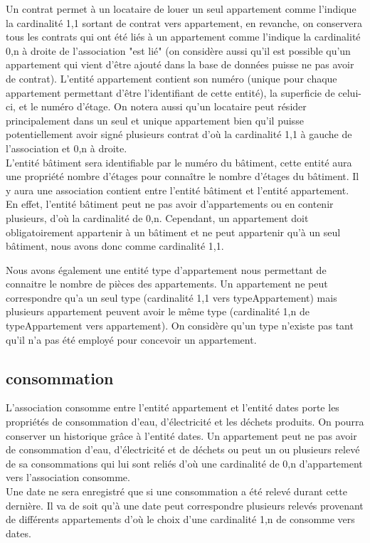 Un contrat permet à un locataire de louer un seul appartement comme l'indique la cardinalité 1,1 sortant de contrat vers appartement, en revanche, on conservera tous les contrats qui ont été liés à un appartement comme l'indique la cardinalité 0,n à droite de l'association "est lié" (on considère aussi qu’il est possible qu’un appartement qui vient d’être ajouté dans la base de données puisse ne pas avoir de contrat). L’entité appartement contient son numéro (unique pour chaque appartement permettant d'être l'identifiant de cette entité), la superficie de celui-ci, et le numéro d’étage. On notera aussi qu'un locataire peut résider principalement dans un seul et unique appartement bien qu'il puisse potentiellement avoir signé plusieurs contrat d'où la cardinalité 1,1 à gauche de l'association et 0,n à droite.\\

L’entité bâtiment sera identifiable par le numéro du bâtiment, cette entité aura une propriété nombre d’étages pour connaître le nombre d’étages du bâtiment. Il y aura une association contient entre l’entité bâtiment et l’entité appartement. En effet, l’entité bâtiment peut ne pas avoir d’appartements ou en contenir plusieurs, d’où la cardinalité de 0,n. Cependant, un appartement doit obligatoirement appartenir à un bâtiment et ne peut appartenir qu’à un seul bâtiment, nous avons donc comme cardinalité 1,1.
	 
Nous avons également une entité type d’appartement nous permettant de connaitre le nombre de pièces des appartements. Un appartement ne peut correspondre qu'a un seul type (cardinalité 1,1 vers typeAppartement) mais plusieurs appartement peuvent avoir le même type (cardinalité 1,n de typeAppartement vers appartement). On considère qu'un type n'existe pas tant qu'il n'a pas été employé pour concevoir un appartement.

\subsection{consommation}

L'association consomme entre l’entité appartement et l’entité dates porte les propriétés de consommation d'eau, d'électricité et les déchets produits. On pourra conserver un historique grâce à l'entité dates. Un appartement peut ne pas avoir de consommation d’eau, d’électricité et de déchets ou peut un ou plusieurs relevé de sa consommations qui lui sont reliés d'où une cardinalité de 0,n d'appartement vers l'association consomme.\\

Une date ne sera enregistré que si une consommation a été relevé durant cette dernière. Il va de soit qu'à une date peut correspondre plusieurs relevés provenant de différents appartements d'où le choix d'une cardinalité 1,n de consomme vers dates.
